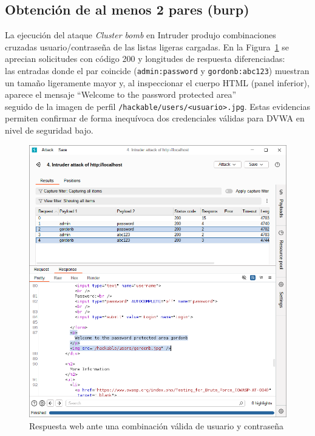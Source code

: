 \documentclass[letterpaper,12pt]{article}
\let\origsubsection\subsection
\renewcommand{\subsection}{\FloatBarrier\origsubsection}
\begin{document}
\subsection{Obtención de al menos 2 pares (burp)}
La ejecución del ataque \emph{Cluster bomb} en Intruder produjo combinaciones cruzadas usuario/contraseña de las listas ligeras cargadas. En la Figura~\ref{fig:ventanaintruderdoble} se aprecian solicitudes con código 200 y longitudes de respuesta diferenciadas:\\ las entradas donde el par coincide (\texttt{admin:password} y \texttt{gordonb:abc123}) muestran un tamaño ligeramente mayor y, al inspeccionar el cuerpo HTML (panel inferior), aparece el mensaje ``Welcome to the password protected area'' \\ seguido de la imagen de perfil \texttt{/hackable/users/<usuario>.jpg}. Estas evidencias permiten confirmar de forma inequívoca dos credenciales válidas para DVWA en nivel de seguridad bajo.
\begin{figure}
    \centering
    \includegraphics[width=1\linewidth]{Captura desde 2025-10-03 01-09-41.png}
    \caption{Respuesta web ante una combinación válida de usuario y contraseña}
    \label{fig:ventanaintruderdoble}
\end{figure}
\end{document}
